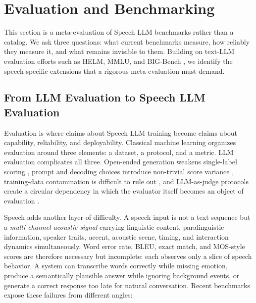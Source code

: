 \section{Evaluation and Benchmarking}
\label{sec:evaluation_benchmarking}

This section is a meta-evaluation of Speech LLM benchmarks rather than a
catalog. We ask three questions: what current benchmarks measure, how
reliably they measure it, and what remains invisible to them. Building on
text-LLM evaluation efforts such as HELM, MMLU, and BIG-Bench
\citep{liang2022helm,hendrycks2021measuring,srivastava2023beyond}, we identify
the speech-specific extensions that a rigorous meta-evaluation must demand.

\subsection{From LLM Evaluation to Speech LLM Evaluation}
\label{subsec:eval_setup}

Evaluation is where claims about Speech LLM training become claims about
capability, reliability, and deployability. Classical machine learning
organizes evaluation around three elements: a dataset, a protocol, and a
metric. LLM evaluation complicates all three. Open-ended generation weakens
single-label scoring \citep{liang2022helm}, prompt and decoding choices
introduce non-trivial score variance \citep{hendrycks2021measuring},
training-data contamination is difficult to rule out
\citep{srivastava2023beyond}, and LLM-as-judge protocols create a circular
dependency in which the evaluator itself becomes an object of evaluation
\citep{zheng2023judging}.

Speech adds another layer of difficulty. A speech input is not a text
sequence but a \emph{multi-channel acoustic signal} carrying linguistic
content, paralinguistic information, speaker traits, accent, acoustic
scene, timing, and interaction dynamics simultaneously. Word error rate,
BLEU, exact match, and MOS-style scores are therefore necessary but
incomplete: each observes only a slice of speech behavior. A system can
transcribe words correctly while missing emotion, produce a semantically
plausible answer while ignoring background events, or generate a correct
response too late for natural conversation. Recent benchmarks expose these
failures from different angles:

